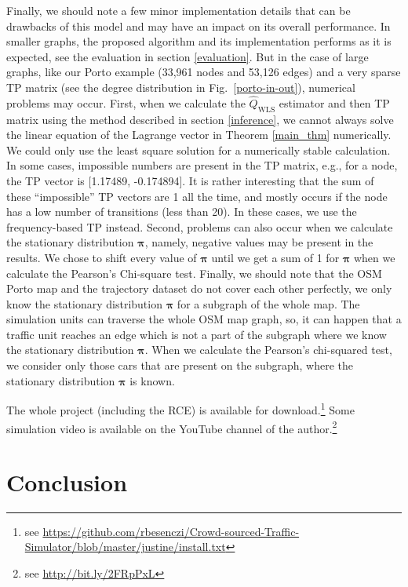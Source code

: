 \documentclass[b5paper,12pt]{report}
\theoremstyle{definition}
\newcommand{\bpi}{\boldsymbol{\pi}}
\begin{document}
Finally, we should note a few minor implementation details that can be drawbacks of this model and may have an impact on its overall performance. In smaller graphs, the proposed algorithm and its implementation performs as it is expected, see the evaluation in section \ref{evaluation}. But in the case of large graphs, like our Porto example (33,961 nodes and 53,126 edges) and a very sparse TP matrix (see the degree distribution in Fig.~\ref{porto-in-out}), numerical problems may occur. First, when we calculate the $\widehat{Q}_{\textrm{WLS}}$ estimator and then TP matrix using the method described in section \ref{inference}, we cannot always solve the linear equation of the Lagrange vector in Theorem \ref{main_thm} numerically. We could only use the least square solution for a numerically stable calculation. In some cases, impossible numbers are present in the TP matrix, e.g., for a node, the TP vector is [1.17489, -0.174894]. It is rather interesting that the sum of these \enquote{impossible} TP vectors are 1 all the time, and mostly occurs if the node has a low number of transitions (less than 20). In these cases, we use the frequency-based TP instead. Second, problems can also occur when we calculate the stationary distribution $\bpi$, namely, negative values may be present in the results. We chose to shift every value of $\bpi$ until we get a sum of 1 for $\bpi$ when we calculate the Pearson's Chi-square test. Finally, we should note that the OSM Porto map and the trajectory dataset do not cover each other perfectly, we only know the stationary distribution $\bpi$ for a subgraph of the whole map. The simulation units can traverse the whole OSM map graph, so, it can happen that a traffic unit reaches an edge which is not a part of the subgraph where we know the stationary distribution $\bpi$. When we calculate the Pearson's chi-squared test, we consider only those cars that are present on the subgraph, where the stationary distribution $\bpi$ is known.

The whole project (including the RCE) is available for download.\footnote{see \url{https://github.com/rbesenczi/Crowd-sourced-Traffic-Simulator/blob/master/justine/install.txt}} Some simulation video is available on the YouTube channel of the author.\footnote{see \url{http://bit.ly/2FRpPxL}}

\chapter{Conclusion}
\label{conclusion}
\end{document}
